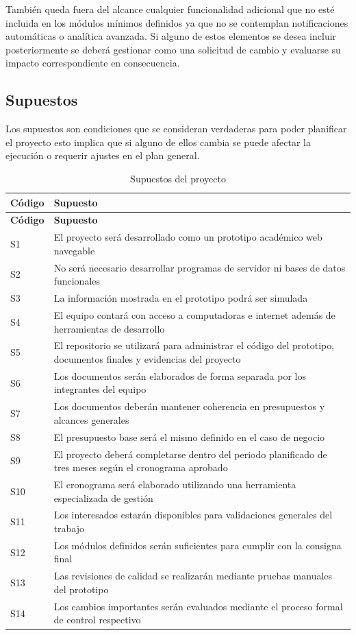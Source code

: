 \documentclass[11pt,spanish]{article}
\begin{document}
También queda fuera del alcance cualquier funcionalidad adicional que no esté incluida en los módulos mínimos definidos ya que no se contemplan notificaciones automáticas o analítica avanzada. Si alguno de estos elementos se desea incluir posteriormente se deberá gestionar como una solicitud de cambio y evaluarse su impacto correspondiente en consecuencia.

\subsection{Supuestos}

Los supuestos son condiciones que se consideran verdaderas para poder planificar el proyecto esto implica que si alguno de ellos cambia se puede afectar la ejecución o requerir ajustes en el plan general.

\begin{longtable}{L{2cm} L{12.4cm}}
\caption{Supuestos del proyecto}\label{tab:supuestos}\\[-0.5em]
\toprule
\textbf{Código} & \textbf{Supuesto} \\
\midrule
\endfirsthead
\toprule
\textbf{Código} & \textbf{Supuesto} \\
\midrule
\endhead
S1 & El proyecto será desarrollado como un prototipo académico web navegable \\
S2 & No será necesario desarrollar programas de servidor ni bases de datos funcionales \\
S3 & La información mostrada en el prototipo podrá ser simulada \\
S4 & El equipo contará con acceso a computadoras e internet además de herramientas de desarrollo \\
S5 & El repositorio se utilizará para administrar el código del prototipo, documentos finales y evidencias del proyecto \\
S6 & Los documentos serán elaborados de forma separada por los integrantes del equipo \\
S7 & Los documentos deberán mantener coherencia en presupuestos y alcances generales \\
S8 & El presupuesto base será el mismo definido en el caso de negocio \\
S9 & El proyecto deberá completarse dentro del periodo planificado de tres meses según el cronograma aprobado \\
S10 & El cronograma será elaborado utilizando una herramienta especializada de gestión \\
S11 & Los interesados estarán disponibles para validaciones generales del trabajo \\
S12 & Los módulos definidos serán suficientes para cumplir con la consigna final \\
S13 & Las revisiones de calidad se realizarán mediante pruebas manuales del prototipo \\
S14 & Los cambios importantes serán evaluados mediante el proceso formal de control respectivo \\
\bottomrule
\end{longtable}
\end{document}
